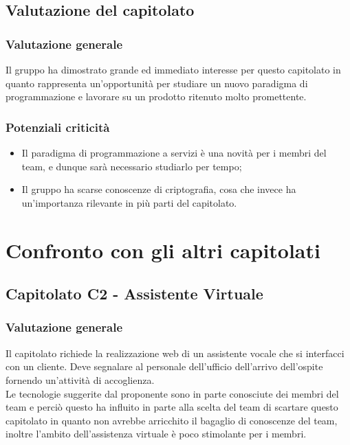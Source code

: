 \documentclass[12pt,a4paper,titlepage]{article}
\begin{document}
	\subsection{Valutazione del capitolato}
	\subsubsection{Valutazione generale }
	Il gruppo ha dimostrato grande ed immediato interesse per questo capitolato in quanto rappresenta un'opportunità per studiare un nuovo paradigma di programmazione e lavorare su un prodotto ritenuto molto promettente. 
	\subsubsection{Potenziali criticità}
	\begin{itemize}
		\item Il paradigma di programmazione a servizi è una novità per i membri del team, e dunque sarà necessario studiarlo per tempo;
		\item Il gruppo ha scarse conoscenze di criptografia, cosa che invece ha un'importanza rilevante in più parti del capitolato.
	\end{itemize}
	
	\newpage
	
	\section{Confronto con gli altri capitolati}
	
	\subsection{Capitolato C2 - Assistente Virtuale}
	\subsubsection{Valutazione generale}
	Il capitolato richiede la realizzazione web di un assistente vocale che si interfacci con un cliente. Deve segnalare al personale dell'ufficio dell'arrivo dell'ospite fornendo un'attività di accoglienza.\\
	Le tecnologie suggerite dal proponente sono in parte conosciute dei membri del team e perciò questo ha influito in parte alla scelta del team di scartare questo capitolato in quanto non avrebbe arricchito il bagaglio di conoscenze del team, inoltre l'ambito dell'assistenza virtuale è poco stimolante per i membri.
\end{document}
